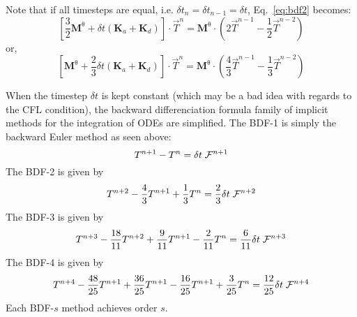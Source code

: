 Note that if all timesteps are equal, i.e. $\delta t_n=\delta t_{n-1}=\delta t$, Eq.~\eqref{eq:bdf2} becomes:
\[
\left[
\frac{3}{2}
{\bm M}^\uptheta
+ \delta t({\bm K}_a + {\bm K}_d)
\right]
 \cdot \vec T^n =
{\bm M}^\uptheta \cdot \left(2 \vec T^{n-1} - \frac{1}{2} \vec T^{n-2} \right)
\]
or, 
\[
\left[
{\bm M}^\uptheta
+ \frac{2}{3}\delta t({\bm K}_a + {\bm K}_d)
\right]
 \cdot \vec T^n =
{\bm M}^\uptheta \cdot \left( \frac{4}{3} \vec T^{n-1} - \frac{1}{3} \vec T^{n-2} \right)
\]

When the timestep $\delta t$ is kept constant (which may be a bad idea with regards to the CFL condition),
the backward differenciation formula family of implicit methods
for the integration of ODEs are simplified. 
The BDF-1 is simply the backward Euler method as seen above:
\[
T^{n+1}-T^n=\delta t\;  {\cal F}^{n+1}
\]
The BDF-2 is given by 
\[
T^{n+2} - \frac{4}{3}T^{n+1} +\frac{1}{3} T^n = \frac{2}{3} \delta t\;  {\cal F}^{n+2}
\]
The BDF-3 is given by 
\[
T^{n+3} - \frac{18}{11}T^{n+2} +\frac{9}{11} T^{n+1} -\frac{2}{11}T^n = \frac{6}{11} \delta t \; {\cal F}^{n+3}
\]
The BDF-4 is given by 
\[
T^{n+4}-\frac{48}{25}T^{n+1}+\frac{36}{25}T^{n+1}-\frac{16}{25}T^{n+1}+\frac{3}{25}T^n 
= \frac{12}{25}\delta t\;  {\cal F}^{n+4}
\]
Each BDF-$s$ method achieves order $s$.





